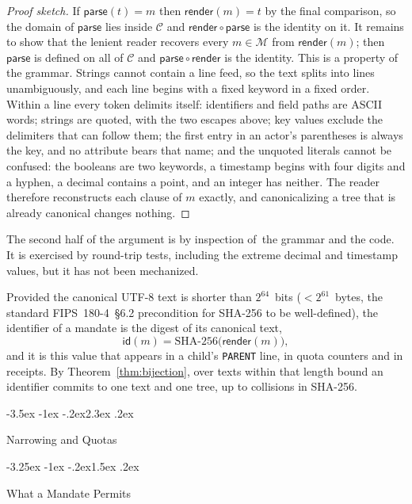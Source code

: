 \documentclass[10pt,twocolumn]{article}
\makeatletter
\theoremstyle{plain}
\theoremstyle{definition}
\renewcommand\section{\@startsection{section}{1}{\z@}%
  {-3.5ex \@plus -1ex \@minus -.2ex}{2.3ex \@plus .2ex}%
  {\normalfont\Large\bfseries\raggedright}}
\renewcommand\subsection{\@startsection{subsection}{2}{\z@}%
  {-3.25ex \@plus -1ex \@minus -.2ex}{1.5ex \@plus .2ex}%
  {\normalfont\large\bfseries\raggedright}}
\makeatother
\begin{document}
\begin{proof}[Proof sketch]
If $\mathsf{parse}(t) = m$ then $\mathsf{render}(m) = t$ by the final comparison, so the domain of $\mathsf{parse}$ lies inside $\mathcal{C}$ and $\mathsf{render} \circ \mathsf{parse}$ is the identity on it. It remains to show that the lenient reader recovers every $m \in \mathcal{M}$ from $\mathsf{render}(m)$; then $\mathsf{parse}$ is defined on all of $\mathcal{C}$ and $\mathsf{parse} \circ \mathsf{render}$ is the identity. This is a property of the grammar. Strings cannot contain a line feed, so the text splits into lines unambiguously, and each line begins with a fixed keyword in a fixed order. Within a line every token delimits itself: identifiers and field paths are ASCII words; strings are quoted, with the two escapes above; key values exclude the delimiters that can follow them; the first entry in an actor's parentheses is always the key, and no attribute bears that name; and the unquoted literals cannot be confused: the booleans are two keywords, a timestamp begins with four digits and a hyphen, a decimal contains a point, and an integer has neither. The reader therefore reconstructs each clause of $m$ exactly, and canonicalizing a tree that is already canonical changes nothing.
\end{proof}

The second half of the argument is by inspection of~the grammar and the code. It is exercised by round-trip tests, including the extreme decimal and timestamp values, but it has not been mechanized.

Provided the canonical UTF-8 text is shorter than $2^{64}$~bits ($< 2^{61}$~bytes, the standard FIPS~180-4~\S6.2 precondition for SHA-256 to be well-defined), the identifier of a mandate is the digest of its canonical text,
\[
  \mathsf{id}(m) = \mathrm{SHA\text{-}256}\bigl(\mathsf{render}(m)\bigr),
\]
and it is this value that appears in a child's \texttt{PARENT} line, in quota counters and in receipts. By Theorem~\ref{thm:bijection}, over texts within that length bound an identifier commits to one text and one tree, up to collisions in SHA-256.

\section{Narrowing and Quotas}
\label{sec:narrowing}

\subsection{What a Mandate Permits}
\label{sec:semantics}
\end{document}
